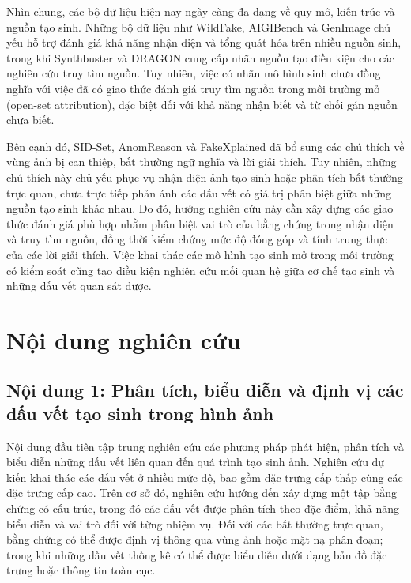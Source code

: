 \documentclass[12pt]{report}
\begin{document}
Nhìn chung, các bộ dữ liệu hiện nay ngày càng đa dạng về quy mô, kiến trúc và nguồn tạo sinh. Những bộ dữ liệu như WildFake, AIGIBench và GenImage chủ yếu hỗ trợ đánh giá khả năng nhận diện và tổng quát hóa trên nhiều nguồn sinh, trong khi Synthbuster và DRAGON cung cấp nhãn nguồn tạo điều kiện cho các nghiên cứu truy tìm nguồn. Tuy nhiên, việc có nhãn mô hình sinh chưa đồng nghĩa với việc đã có giao thức đánh giá truy tìm nguồn trong môi trường mở (open-set attribution), đặc biệt đối với khả năng nhận biết và từ chối gán nguồn chưa biết.

Bên cạnh đó, SID-Set, AnomReason và FakeXplained đã bổ sung các chú thích về vùng ảnh bị can thiệp, bất thường ngữ nghĩa và lời giải thích. Tuy nhiên, những chú thích này chủ yếu phục vụ nhận diện ảnh tạo sinh hoặc phân tích bất thường trực quan, chưa trực tiếp phản ánh các dấu vết có giá trị phân biệt giữa những nguồn tạo sinh khác nhau. Do đó, hướng nghiên cứu này cần xây dựng các giao thức đánh giá phù hợp nhằm phân biệt vai trò của bằng chứng trong nhận diện và truy tìm nguồn, đồng thời kiểm chứng mức độ đóng góp và tính trung thực của các lời giải thích. Việc khai thác các mô hình tạo sinh mở trong môi trường có kiểm soát cũng tạo điều kiện nghiên cứu mối quan hệ giữa cơ chế tạo sinh và những dấu vết quan sát được.

\section{Nội dung nghiên cứu}
\label{sec:research_content} 
\subsection{Nội dung 1: Phân tích, biểu diễn và định vị các dấu vết tạo sinh trong hình ảnh}
Nội dung đầu tiên tập trung nghiên cứu các phương pháp phát hiện, phân tích và biểu diễn những dấu vết liên quan đến quá trình tạo sinh ảnh. Nghiên cứu dự kiến khai thác các dấu vết ở nhiều mức độ, bao gồm đặc trưng cấp thấp cùng các đặc trưng cấp cao. Trên cơ sở đó, nghiên cứu hướng đến xây dựng một tập bằng chứng có cấu trúc, trong đó các dấu vết được phân tích theo đặc điểm, khả năng biểu diễn và vai trò đối với từng nhiệm vụ. Đối với các bất thường trực quan, bằng chứng có thể được định vị thông qua vùng ảnh hoặc mặt nạ phân đoạn; trong khi những dấu vết thống kê có thể được biểu diễn dưới dạng bản đồ đặc trưng hoặc thông tin toàn cục.
\end{document}
